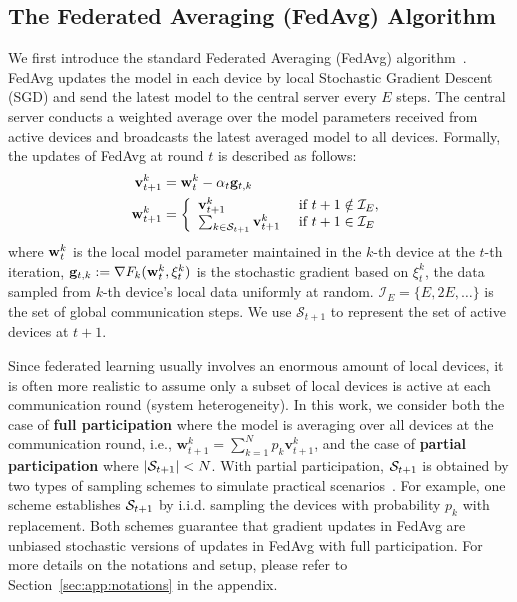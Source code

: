 \subsection{The Federated Averaging (FedAvg) Algorithm}
We first introduce the standard Federated Averaging (FedAvg) algorithm~\cite{mcmahan2016communication}.
FedAvg updates the model in each device by local Stochastic Gradient Descent (SGD) and send the latest model to the central server every $E$
steps. The central server conducts a weighted average over the model parameters
received from active devices and broadcasts the latest averaged model to all devices.
Formally, the updates of FedAvg at round $t$ is described as follows:
\begin{align}
{\mathbf{v}}_{t+1}^{k} & ={\mathbf{w}}_{t}^{k}-\alpha_{t}{\mathbf{g}}_{t,k}\\
\mathbf{w}_{t+1}^{k} &=\left\{
\begin{array}{ll}
\mathbf{v}_{t+1}^{k} & \text { if } t+1 \notin \mathcal{I}_{E}, \\ 
\sum_{k \in {\mathcal{S}}_{t+1}} \mathbf{v}_{t+1}^{k} & \text { if } t+1 \in \mathcal{I}_{E}
\end{array}\right.
\end{align}
where ${\mathbf{w}}_t^k$ is the local model parameter maintained in the $k$-th device at the $t$-th iteration, ${\mathbf{g}}_{t,k}:=\nabla F_{k}({\mathbf{w}}_{t}^{k},\xi_{t}^{k})$ is the stochastic gradient based on $\xi_{t}^{k}$, the data sampled from $k$-th device’s local data uniformly at random. $\mathcal{I}_{E}=\{E,2E,\dots\}$ is the set of global communication steps. We use $\mathcal{S}_{t+1}$ to represent the set of active devices at $t+1$.

Since federated learning usually involves an enormous amount of 
local devices, it is often more realistic to assume only a subset of 
local devices is active at each communication round (system heterogeneity). In this work,
we consider both the case of \textbf{full participation} where the model is
averaging over all devices at the communication round, i.e.,
$\mathbf{w}_{t+1}^{k} = \sum_{k=1}^N p_k \mathbf{v}_{t+1}^{k}$, and
the case of \textbf{partial participation} where $|{\mathcal{S}}_{t+1}| < N$. 
With partial participation, ${\mathcal{S}}_{t+1}$ is obtained by two types of
sampling schemes to simulate practical scenarios~\cite{li2019convergence}. For example, one scheme establishes ${\mathcal{S}}_{t+1}$ by i.i.d. sampling the devices with probability $p_k$ with replacement. 
Both schemes
guarantee that gradient updates in FedAvg are unbiased stochastic versions of
updates in FedAvg with full participation. For 
more details on the notations and setup, please refer to Section~\ref{sec:app:notations} in the appendix.

